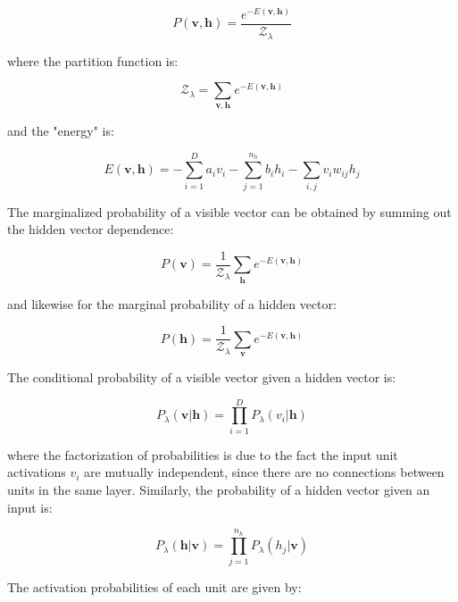 \documentclass[12pt, two sided]{article}
\begin{document}
\begin{equation}
P(\mathbf{v},\mathbf{h}) = \frac{e^{-E(\mathbf{v},\mathbf{h})}}{\mathcal{Z}_{\lambda}} 
\end{equation}

where the partition function is: 

\begin{equation}
\mathcal{Z}_{\lambda} = \sum_{\mathbf{v},\mathbf{h}} e^{-E(\mathbf{v},\mathbf{h})}
\end{equation}

and the "energy" is:

\begin{equation}
E(\mathbf{v},\mathbf{h}) = -\sum_{i=1}^D a_i v_i - \sum_{j=1}^{n_h} b_i h_i - \sum_{i,j} v_i w_{ij} h_j
\end{equation}

The marginalized probability of a visible vector can be obtained by summing out the hidden vector dependence:

\begin{equation}
P(\mathbf{v}) = \frac{1}{{\mathcal{Z}_{\lambda}}} \sum_{\mathbf{h}} e^{-E(\mathbf{v,h})}
\end{equation}

and likewise for the marginal probability of a hidden vector:

\begin{equation}
P(\mathbf{h}) = \frac{1}{{\mathcal{Z}_{\lambda}}} \sum_{\mathbf{v}} e^{-E(\mathbf{v,h})}
\end{equation}

The conditional probability of a visible vector given a hidden vector is:

\begin{equation}
P_{\lambda}(\mathbf{v} \vert \mathbf{h}) = \prod_{i=1}^{D} P_{\lambda}(v_i \vert \mathbf{h})
\end{equation}

where the factorization of probabilities is due to the fact the input unit activations $v_i$ are mutually independent, since there are no connections between units in the same layer. Similarly, the probability of a hidden vector given an input is:

\begin{equation}
P_{\lambda}(\mathbf{h} \vert \mathbf{v}) = \prod_{j=1}^{n_h} P_{\lambda}(h_j \vert \mathbf{v})
\end{equation}

The activation probabilities of each unit are given by:
\end{document}

